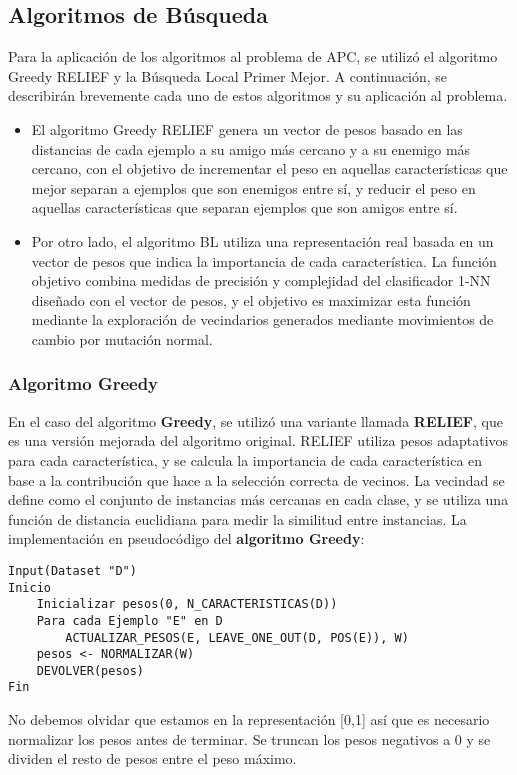 \subsection{Algoritmos de Búsqueda}

Para la aplicación de los algoritmos al problema de APC, se utilizó el algoritmo Greedy RELIEF y la Búsqueda Local Primer Mejor. A continuación, se describirán brevemente cada uno de estos algoritmos y su aplicación al problema.

\begin{itemize}
	\item El algoritmo Greedy RELIEF genera un vector de pesos basado en las distancias de cada ejemplo a su amigo más cercano y a su enemigo más cercano, con el objetivo de incrementar el peso en aquellas características que mejor separan a ejemplos que son enemigos entre sí, y reducir el peso en aquellas características que separan ejemplos que son amigos entre sí. 
	
	\item Por otro lado, el algoritmo BL utiliza una representación real basada en un vector de pesos que indica la importancia de cada característica. La función objetivo combina medidas de precisión y complejidad del clasificador 1-NN diseñado con el vector de pesos, y el objetivo es maximizar esta función mediante la exploración de vecindarios generados mediante movimientos de cambio por mutación normal.
\end{itemize}

\subsubsection{Algoritmo Greedy}

En el caso del algoritmo \textbf{Greedy}, se utilizó una variante llamada \textbf{RELIEF}, que es una versión mejorada del algoritmo original. RELIEF utiliza pesos adaptativos para cada característica, y se calcula la importancia de cada característica en base a la contribución que hace a la selección correcta de vecinos. La vecindad se define como el conjunto de instancias más cercanas en cada clase, y se utiliza una función de distancia euclidiana para medir la similitud entre instancias. La implementación en pseudocódigo del \textbf{algoritmo Greedy}:
\begin{verbatim}
Input(Dataset "D")
Inicio
    Inicializar pesos(0, N_CARACTERISTICAS(D))
    Para cada Ejemplo "E" en D
        ACTUALIZAR_PESOS(E, LEAVE_ONE_OUT(D, POS(E)), W)
    pesos <- NORMALIZAR(W)
    DEVOLVER(pesos)
Fin
\end{verbatim}
No debemos olvidar que estamos en la representación [0,1] así que es necesario normalizar los pesos antes de terminar. Se truncan los pesos negativos a 0 y se dividen el resto de pesos entre el peso máximo.

